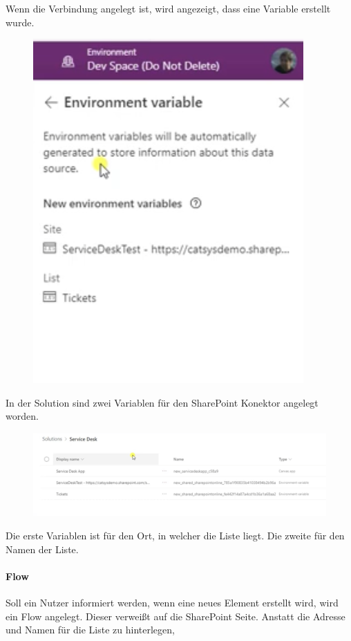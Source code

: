 Wenn die Verbindung angelegt ist, wird angezeigt, dass eine \Env Variable erstellt wurde.

\begin{figure}[H]
	\centering
	\includegraphics[scale = 0.3]{attachment/chapter_13/Scc056}
\end{figure}

In der Solution sind zwei Variablen für den SharePoint Konektor angelegt worden.

\begin{figure}[H]
	\centering
	\includegraphics[scale = 0.3]{attachment/chapter_13/Scc058}
\end{figure}

Die erste \Env Variablen ist für den Ort, in welcher die Liste liegt. Die zweite für den Namen der Liste.

\paragraph{Flow}
Soll ein Nutzer informiert werden, wenn eine neues Element erstellt wird, wird ein Flow angelegt. Dieser verweißt auf die SharePoint Seite. Anstatt die Adresse und Namen für die Liste zu hinterlegen,

